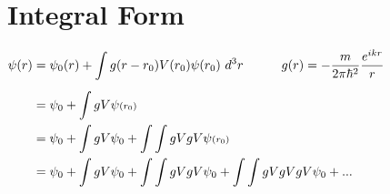 \documentclass[12pt]{article}
\begin{document}
\newpage
\section{Integral Form}

\hspace{.5cm} \(\begin{aligned}
    \psi(r) &= \psi_0(r) + \int g(r-r_0) V(r_0) \psi(r_0) \ d^3r 
        \indent \indent g(r) = -\frac{m}{2\pi \hbar^2} \frac{e^{ikr}}{r}\\[5pt]
    &= \psi_0 + \int g V \psi{\scriptstyle(r_0)}\\
    &= \psi_0 + \int g V \psi_0 + \int \int g V g V \psi{\scriptstyle(r_0)}\\
    &= \psi_0 + \int g V \psi_0 + \int \int g V g V \psi_0 + \int \int g V g V g V \psi_0 + ...
\end{aligned}\)
\end{document}
